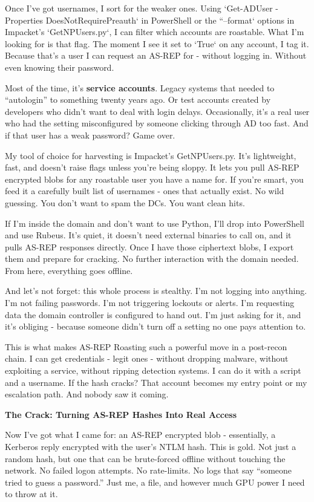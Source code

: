 Once I’ve got usernames, I sort for the weaker ones. Using `Get-ADUser -Properties DoesNotRequirePreauth` in PowerShell or the ``--format` options in Impacket’s `GetNPUsers.py`, I can filter which accounts are roastable. What I’m looking for is that flag. The moment I see it set to `True` on any account, I tag it. Because that’s a user I can request an AS-REP for - without logging in. Without even knowing their password.

Most of the time, it’s \textbf{service accounts}. Legacy systems that needed to “autologin” to something twenty years ago. Or test accounts created by developers who didn’t want to deal with login delays. Occasionally, it’s a real user who had the setting misconfigured by someone clicking through AD too fast. And if that user has a weak password? Game over.

My tool of choice for harvesting is Impacket’s GetNPUsers.py. It’s lightweight, fast, and doesn’t raise flags unless you’re being sloppy. It lets you pull AS-REP encrypted blobs for any roastable user you have a name for. If you’re smart, you feed it a carefully built list of usernames - ones that actually exist. No wild guessing. You don’t want to spam the DCs. You want clean hits.

If I’m inside the domain and don’t want to use Python, I’ll drop into PowerShell and use Rubeus. It’s quiet, it doesn’t need external binaries to call on, and it pulls AS-REP responses directly. Once I have those ciphertext blobs, I export them and prepare for cracking. No further interaction with the domain needed. From here, everything goes offline.

And let’s not forget: this whole process is stealthy. I’m not logging into anything. I’m not failing passwords. I’m not triggering lockouts or alerts. I’m requesting data the domain controller is configured to hand out. I’m just asking for it, and it’s obliging - because someone didn’t turn off a setting no one pays attention to.

This is what makes AS-REP Roasting such a powerful move in a post-recon chain. I can get credentials - legit ones - without dropping malware, without exploiting a service, without ripping detection systems. I can do it with a script and a username. If the hash cracks? That account becomes my entry point or my escalation path. And nobody saw it coming.

\textbf{The Crack: Turning AS-REP Hashes Into Real Access}

Now I’ve got what I came for: an AS-REP encrypted blob - essentially, a Kerberos reply encrypted with the user’s NTLM hash. This is gold. Not just a random hash, but one that can be brute-forced offline without touching the network. No failed logon attempts. No rate-limits. No logs that say “someone tried to guess a password.” Just me, a file, and however much GPU power I need to throw at it.


